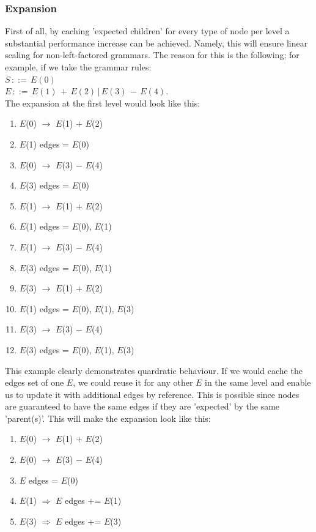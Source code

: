 \documentclass[a4paper,10pt]{article}
\begin{document}
\subsubsection{Expansion}
First of all, by caching 'expected children' for every type of node per level a substantial performance increase can be achieved. Namely, this will ensure linear scaling for non-left-factored grammars. The reason for this is the following; for example, if we take the grammar rules:\\
$S\,::=\,E(0)$\\
$E\,::=\,E(1)\,+\,E(2)\,|\,E(3)\,-\,E(4)$.\\
The expansion at the first level would look like this:
\begin{enumerate}
 \setlength{\itemsep}{0pt}
 \setlength{\parskip}{0pt}
 \setlength{\parsep}{0pt}
 
 \item $E$(0) $\rightarrow$ $E$(1) $+$ $E$(2)
 \item $E$(1) edges = {$E$(0)}
 \item $E$(0) $\rightarrow$ $E$(3) $-$ $E$(4)
 \item $E$(3) edges = {$E$(0)}
 \item $E$(1) $\rightarrow$ $E$(1) $+$ $E$(2)
 \item $E$(1) edges = {$E$(0), $E$(1)}
 \item $E$(1) $\rightarrow$ $E$(3) $-$ $E$(4)
 \item $E$(3) edges = {$E$(0), $E$(1)}
 \item $E$(3) $\rightarrow$ $E$(1) $+$ $E$(2)
 \item $E$(1) edges = {$E$(0), $E$(1), $E$(3)}
 \item $E$(3) $\rightarrow$ $E$(3) $-$ $E$(4)
 \item $E$(3) edges = {$E$(0), $E$(1), $E$(3)}
\end{enumerate}
This example clearly demonstrates quardratic behaviour. If we would cache the edges set of one $E$, we could reuse it for any other $E$ in the same level and enable us to update it with additional edges by reference. This is possible since nodes are guaranteed to have the same edges if they are 'expected' by the same 'parent(s)'. This will make the expansion look like this:
\begin{enumerate}
 \setlength{\itemsep}{0pt}
 \setlength{\parskip}{0pt}
 \setlength{\parsep}{0pt}
 
 \item $E$(0) $\rightarrow$ $E$(1) $+$ $E$(2)
 \item $E$(0) $\rightarrow$ $E$(3) $-$ $E$(4)
 \item $E$ edges = {$E$(0)}
 \item $E$(1) $\Rightarrow$ $E$ edges += $E$(1)
 \item $E$(3) $\Rightarrow$ $E$ edges += $E$(3)
\end{enumerate}
\end{document}

